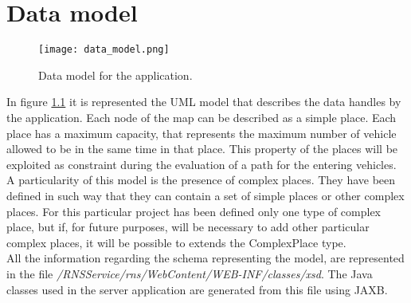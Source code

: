 \chapter{Data model}\label{Chap:DataModel}
\begin{figure}[!htb]
   \centering
   \texttt{[image: data\_model.png]}
   \caption{Data model for the application.}\label{Fig:data_model}
\end{figure}
In figure \ref{Fig:data_model} it is represented the UML model that describes the data handles by the application. Each node of the map can be described as a simple place. Each place has a maximum capacity, that represents the maximum number of vehicle allowed to be in the same time in that place. This property of the places will be exploited as constraint during the evaluation of a path for the entering vehicles. A particularity of this model is the presence of complex places. They have been defined in such way that they can contain a set of simple places or other complex places. For this particular project has been defined only one type of complex place, but if, for future purposes, will be necessary to add other particular complex places, it will be possible to extends the ComplexPlace type.\\
All the information regarding the schema representing the model, are represented in the file \textit{/RNSService/rns/WebContent/WEB-INF/classes/xsd}. The Java classes used in the server application are generated from this file using JAXB.
